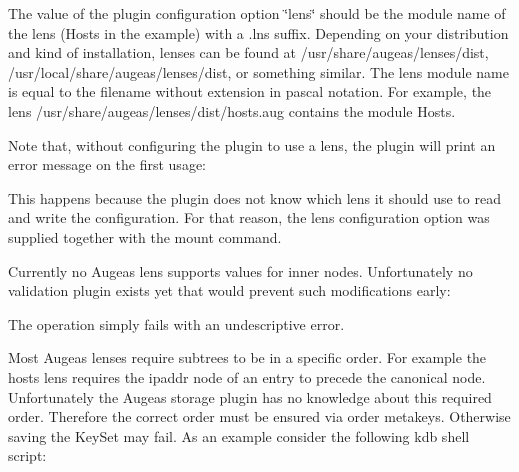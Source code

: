 \begin{DoxyCode}{0}
\end{DoxyCode}


The value of the plugin configuration option \char`\"{}lens\char`\"{} should be the module name of the lens (Hosts in the example) with a \textquotesingle{}.lns\textquotesingle{} suffix. Depending on your distribution and kind of installation, lenses can be found at {\ttfamily /usr/share/augeas/lenses/dist}, {\ttfamily /usr/local/share/augeas/lenses/dist}, or something similar. The lens module name is equal to the filename without extension in pascal notation. For example, the lens {\ttfamily /usr/share/augeas/lenses/dist/hosts.aug} contains the module Hosts.

Note that, without configuring the plugin to use a lens, the plugin will print an error message on the first usage\+:


\begin{DoxyCode}{0}
\end{DoxyCode}


This happens because the plugin does not know which lens it should use to read and write the configuration. For that reason, the lens configuration option was supplied together with the mount command.

Currently no Augeas lens supports values for inner nodes. Unfortunately no validation plugin exists yet that would prevent such modifications early\+:


\begin{DoxyCode}{0}
\end{DoxyCode}


The operation simply fails with an undescriptive error.

Most Augeas lenses require subtrees to be in a specific order. For example the hosts lens requires the ipaddr node of an entry to precede the canonical node. Unfortunately the Augeas storage plugin has no knowledge about this required order. Therefore the correct order must be ensured via order metakeys. Otherwise saving the Key\+Set may fail. As an example consider the following kdb shell script\+:


